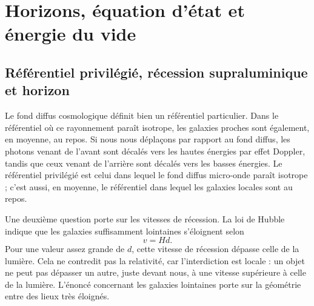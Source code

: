 \chapter{Horizons, équation d’état et énergie du vide}

\section{Référentiel privilégié, récession supraluminique et horizon}

Le fond diffus cosmologique définit bien un référentiel particulier. Dans le référentiel où ce rayonnement paraît isotrope, les galaxies proches sont également, en moyenne, au repos. Si nous nous déplaçons par rapport au fond diffus, les photons venant de l’avant sont décalés vers les hautes énergies par effet Doppler, tandis que ceux venant de l’arrière sont décalés vers les basses énergies. Le référentiel privilégié est celui dans lequel le fond diffus micro-onde paraît isotrope ; c’est aussi, en moyenne, le référentiel dans lequel les galaxies locales sont au repos.

\begin{classroomqa}\end{classroomqa}

Une deuxième question porte sur les vitesses de récession. La loi de Hubble indique que les galaxies suffisamment lointaines s’éloignent selon
\begin{equation}
v = H d .
\end{equation}
Pour une valeur assez grande de \(d\), cette vitesse de récession dépasse celle de la lumière. Cela ne contredit pas la relativité, car l’interdiction est locale : un objet ne peut pas dépasser un autre, juste devant nous, à une vitesse supérieure à celle de la lumière. L’énoncé concernant les galaxies lointaines porte sur la géométrie entre des lieux très éloignés.

\begin{classroomqa}\end{classroomqa}

